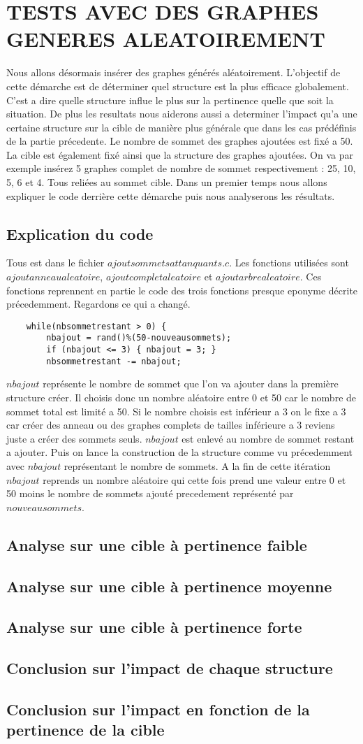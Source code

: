\documentclass[a4paper,11pt]{article}
\begin{document}
\section{TESTS AVEC DES GRAPHES GENERES ALEATOIREMENT}
	Nous allons désormais insérer des graphes générés aléatoirement.
	L'objectif de cette démarche est de déterminer quel structure est la plus efficace globalement.
	C'est a dire quelle structure influe le plus sur la pertinence quelle que soit la situation.
	De plus les resultats nous aiderons aussi a determiner l'impact qu'a une certaine structure sur la cible de manière plus générale 
	que dans les cas prédéfinis de la partie précedente.
	Le nombre de sommet des graphes ajoutées est fixé a 50.
	La cible est également fixé ainsi que la structure des graphes ajoutées.
	On va par exemple insérez 5 graphes complet de nombre de sommet respectivement : 25, 10, 5, 6 et 4. Tous reliées au sommet cible.
	Dans un premier temps nous allons expliquer le code derrière cette démarche puis nous analyserons les résultats.
	\subsection{Explication du code}
		Tous est dans le fichier $ajoutsommetsattanquants.c$. Les fonctions utilisées sont $ajoutanneaualeatoire$, $ajoutcompletaleatoire$
		et $ajoutarbrealeatoire$. Ces fonctions reprennent en partie le code des trois fonctions presque eponyme décrite précedemment.
		Regardons ce qui a changé. 
		\begin{lstlisting}
	while(nbsommetrestant > 0) {
		nbajout = rand()%(50-nouveausommets);
		if (nbajout <= 3) { nbajout = 3; }
		nbsommetrestant -= nbajout;
		\end{lstlisting}
		$nbajout$ représente le nombre de sommet que l'on va ajouter dans la première structure créer. Il choisis donc un nombre 
		aléatoire entre 0 et 50 car le nombre de sommet total est limité a 50. Si le nombre choisis est inférieur a 3 on le fixe a 3 car créer
		des anneau ou des graphes complets de tailles inférieure a 3 reviens juste a créer des sommets seuls.
		$nbajout$ est enlevé au nombre de sommet restant a ajouter. Puis on lance la construction de la structure comme vu précedemment 
		avec $nbajout$ représentant le nombre de sommets. A la fin de cette itération $nbajout$ reprends un nombre aléatoire qui cette fois
		prend une valeur entre 0 et 50 moins le nombre de sommets ajouté precedement représenté par $nouveausommets$.
	\subsection{Analyse sur une cible à pertinence faible}
	\subsection{Analyse sur une cible à pertinence moyenne}
	\subsection{Analyse sur une cible à pertinence forte}
	\subsection{Conclusion sur l'impact de chaque structure}
	\subsection{Conclusion sur l'impact en fonction de la pertinence de la cible}
\end{document}
